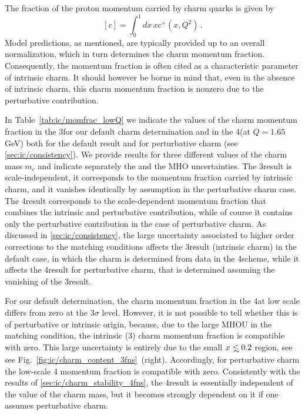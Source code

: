 
The fraction of the proton momentum carried by charm quarks
is given by
\begin{equation}
\label{eq:ic/charm_momentum_fraction}
\left[ c\right] = \int_0^1dx\, x c^+(x,Q^2) \, .
\end{equation}
Model predictions, as mentioned, are typically provided up to an
overall normalization, which in turn determines the charm momentum fraction.
%
Consequently, the momentum fraction is often cited as a characteristic
parameter of intrinsic charm.
%
It should however be borne in mind that,
even in the absence of intrinsic charm, this charm momentum fraction is nonzero due
to the perturbative contribution.

In Table~\ref{tab:ic/momfrac_lowQ} we indicate
the values of the charm momentum fraction
 in the 3\fns for our default charm
  determination and in the 4\fns  (at $Q=1.65$ GeV) both for the
  default result and for perturbative charm \pdf (see \cref{sec:ic/consistency}).
%
We provide results for  three different values of the charm mass $m_c$ and
indicate separately the \pdf and the MHO uncertainties.
%
The 3\fns result is scale-independent, it corresponds to the
momentum fraction carried by intrinsic charm, and it vanishes identically
by assumption in the perturbative charm case.
%
The 4\fns result corresponds to
the scale-dependent momentum fraction that combines the intrinsic and
perturbative contribution, while of course it contains only the
perturbative contribution in the case of perturbative charm.
%
As
discussed in \cref{sec:ic/consistency}, the large uncertainty
associated to higher order corrections to the matching conditions
affects the 3\fns result (intrinsic charm) in the default case, in
which the charm \pdf is determined from data in the 4\fns scheme, while
it affects the 4\fns result for perturbative charm, that is determined
assuming the vanishing of the 3\fns result.

 For our default determination, the charm
momentum fraction in the 4\fns at low scale
differs from zero at the $3\sigma$
level.
%
However, it is not possible to tell whether this is of
perturbative or intrinsic origin, because, due to  the large MHOU in
the matching condition, the intrinsic (3\fns) charm momentum fraction
is compatible with zero. This large uncertainty is entirely due to the
small $x\lsim 0.2$ region, see see
Fig.~\ref{fig:ic/charm_content_3fns}~(right).
%
Accordingly, for perturbative charm the
low-scale 4\fns
momentum fraction is compatible with zero.
%
Consistently with the results of \cref{sec:ic/charm_stability_4fns},
the 4\fns result is essentially independent of the value of the charm
mass, but it becomes strongly dependent on it if one assumes
perturbative charm.

